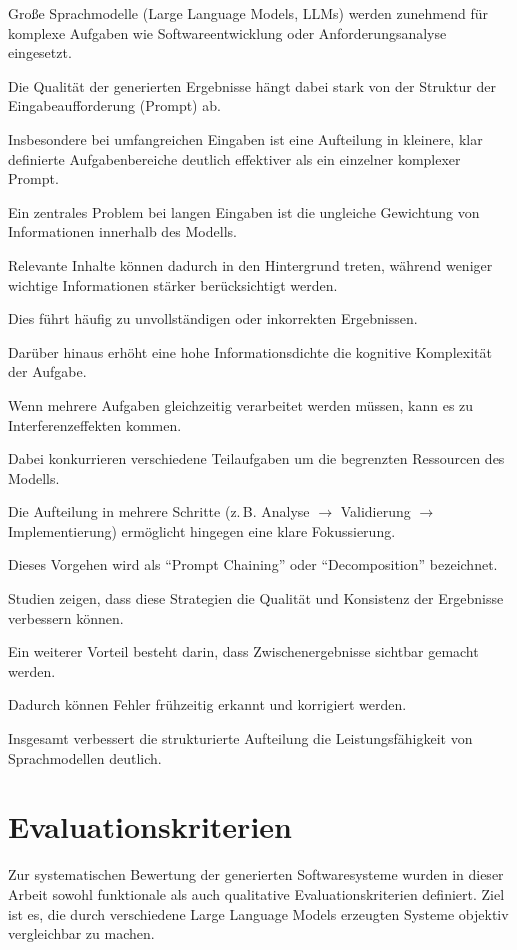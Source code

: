 Große Sprachmodelle (Large Language Models, LLMs)
werden zunehmend für komplexe Aufgaben wie
Softwareentwicklung oder Anforderungsanalyse eingesetzt.

Die Qualität der generierten Ergebnisse hängt dabei
stark von der Struktur der Eingabeaufforderung
(Prompt) ab.

Insbesondere bei umfangreichen Eingaben ist eine
Aufteilung in kleinere, klar definierte Aufgabenbereiche
deutlich effektiver als ein einzelner komplexer Prompt.

Ein zentrales Problem bei langen Eingaben ist die
ungleiche Gewichtung von Informationen innerhalb des
Modells.

Relevante Inhalte können dadurch in den Hintergrund
treten, während weniger wichtige Informationen stärker
berücksichtigt werden.

Dies führt häufig zu unvollständigen oder inkorrekten
Ergebnissen.

Darüber hinaus erhöht eine hohe Informationsdichte die
kognitive Komplexität der Aufgabe.

Wenn mehrere Aufgaben gleichzeitig verarbeitet werden
müssen, kann es zu Interferenzeffekten kommen.

Dabei konkurrieren verschiedene Teilaufgaben um die
begrenzten Ressourcen des Modells.

Die Aufteilung in mehrere Schritte (z.\,B. Analyse
$\rightarrow$ Validierung $\rightarrow$ Implementierung)
ermöglicht hingegen eine klare Fokussierung.

Dieses Vorgehen wird als ``Prompt Chaining'' oder
``Decomposition'' bezeichnet.

Studien zeigen, dass diese Strategien die Qualität und
Konsistenz der Ergebnisse verbessern können.

Ein weiterer Vorteil besteht darin, dass
Zwischenergebnisse sichtbar gemacht werden.

Dadurch können Fehler frühzeitig erkannt und korrigiert
werden.

Insgesamt verbessert die strukturierte Aufteilung die
Leistungsfähigkeit von Sprachmodellen deutlich.




\section{Evaluationskriterien}

Zur systematischen Bewertung der generierten Softwaresysteme
wurden in dieser Arbeit sowohl funktionale als auch
qualitative Evaluationskriterien definiert. Ziel ist es,
die durch verschiedene Large Language Models erzeugten
Systeme objektiv vergleichbar zu machen.


